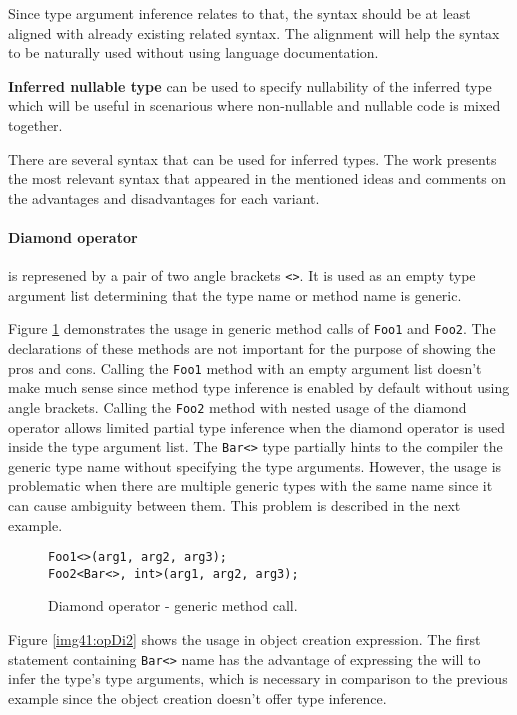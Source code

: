 Since type argument inference relates to that, the syntax should be at least aligned with already existing related syntax. 
The alignment will help the syntax to be naturally used without using language documentation.
\par
\textbf{Inferred nullable type} can be used to specify nullability of the inferred type which will be useful in scenarious where non-nullable and nullable code is mixed together.
\par
There are several syntax that can be used for inferred types. 
The work presents the most relevant syntax that appeared in the mentioned ideas and comments on the advantages and disadvantages for each variant.

\paragraph*{Diamond operator} is represened by a pair of two angle brackets \texttt{<>}.
It is used as an empty type argument list determining that the type name or method name is generic.
\par
Figure \ref{img40:opDi1} demonstrates the usage in generic method calls of \texttt{Foo1} and \texttt{Foo2}. 
The declarations of these methods are not important for the purpose of showing the pros and cons. 
Calling the \texttt{Foo1} method with an empty argument list doesn’t make much sense since method type inference is enabled by default without using angle brackets. 
Calling the \texttt{Foo2} method with nested usage of the diamond operator allows limited partial type inference when the diamond operator is used inside the type argument list. 
The \texttt{Bar<>} type partially hints to the compiler the generic type name without specifying the type arguments. 
However, the usage is problematic when there are multiple generic types with the same name since it can cause ambiguity between them. 
This problem is described in the next example.
\begin{figure}[h]
\begin{lstlisting}[style=csharp]
Foo1<>(arg1, arg2, arg3);
Foo2<Bar<>, int>(arg1, arg2, arg3);
\end{lstlisting}
\caption{Diamond operator - generic method call.}
\label{img40:opDi1}
\end{figure}
\par
Figure \ref{img41:opDi2} shows the usage in object creation expression. 
The first statement containing \texttt{Bar<>} name has the advantage of expressing the will to infer the type’s type arguments, which is necessary in comparison to the previous example since the object creation doesn’t offer type inference. 
